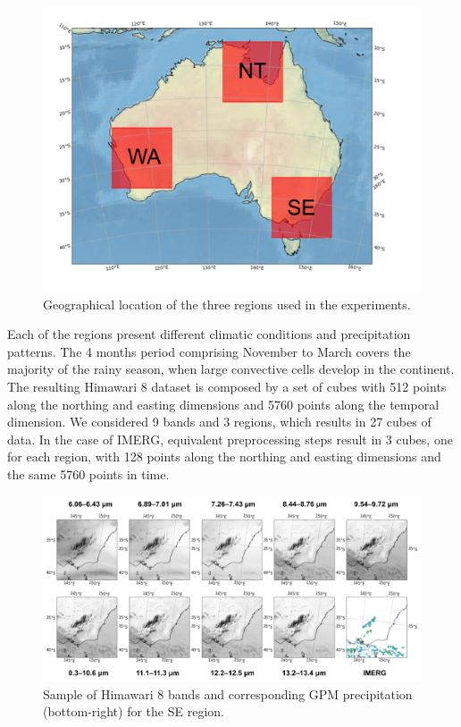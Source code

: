 \documentclass[3p,times]{elsarticle}
\begin{document}
\begin{figure}%
    \includegraphics[width=12cm]{regions.png}
    \caption{Geographical location of the three regions used in the experiments.}%
    \label{regions}%
\end{figure}

Each of the regions present different climatic conditions and precipitation patterns. The 4 months period comprising November to March covers the majority of the rainy season, when large convective cells develop in the continent. The resulting Himawari 8 dataset is composed by a set of cubes with 512 points along the northing and easting dimensions and 5760 points along the temporal dimension. We considered 9 bands and 3 regions, which results in 27 cubes of data. In the case of IMERG, equivalent preprocessing steps result in 3 cubes, one for each region, with 128 points along the northing and easting dimensions and the same 5760 points in time.

\begin{figure}%
    \includegraphics[width=14cm]{dataset.png}
    \caption{Sample of Himawari 8 bands and corresponding GPM precipitation (bottom-right) for the SE region.}%
    \label{dataset}%
\end{figure}
\end{document}
